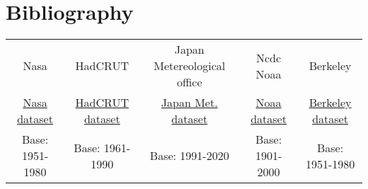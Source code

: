 \documentclass[a4paper,11pt,rmp,superscriptaddress]{revtex4}
\begin{document}
\section*{Bibliography}


\begin{tabular}{ c  c  c  c  c }
    Nasa    &   HadCRUT     &   Japan Metereological office     &   Ncdc Noaa   &   Berkeley \\
    \href{https://data.giss.nasa.gov/gistemp/graphs_v4/graph_data/Global_Mean_Estimates_based_on_Land_and_Ocean_Data/graph.txt}{Nasa dataset} & 
    \href{https://www.metoffice.gov.uk/hadobs/hadcrut5/data/current/download.html} {HadCRUT dataset} &
    \href{https://ds.data.jma.go.jp/tcc/tcc/products/gwp/temp/list/csv/year_wld.csv}{Japan Met. dataset} &
    \href{https://www.ncdc.noaa.gov/cag/global/time-series/globe/land_ocean/12/12/1880-2023/data.csv}{Noaa dataset} &
    \href{https://ds.data.jma.go.jp/tcc/tcc/products/gwp/temp/list/csv/year_wld.csv}{Berkeley dataset} \\
    Base: 1951-1980      &      Base: 1961-1990      & Base: 1991-2020      & Base: 1901-2000    & Base: 1951-1980
\end{tabular}
\end{document}
